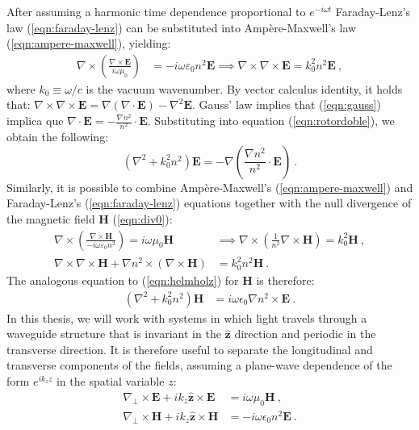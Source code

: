 After assuming a harmonic time dependence proportional to $e^{-i\omega t}$ Faraday-Lenz's law (\ref{eqn:faraday-lenz}) can be substituted into Ampère-Maxwell's law (\ref{eqn:ampere-maxwell}), yielding:
\begin{align}
	\nabla\times\left(\frac{\nabla\times\textbf{E}}{i\omega\mu_0}\right) &= -i\omega \varepsilon_0 n^2 \textbf{E} \implies \nabla\times\nabla\times\textbf{E} = k_0^2n^2\textbf{E} \ , \label{eqn:rotordoble}
\end{align}
where $k_0 \equiv \omega/c$ is the vacuum wavenumber. By vector calculus identity, it holds that: $\nabla\times\nabla\times\textbf{E} = \nabla(\nabla\cdot\textbf{E}) - \nabla^2\textbf{E}$. Gauss' law implies that (\ref{eqn:gauss}) implica que $\nabla\cdot \textbf{E} = -\frac{\nabla n^2}{n^2}\cdot\textbf{E}$. Substituting into equation (\ref{eqn:rotordoble}), we obtain the following:
\begin{equation}
	\left(\nabla^2  + k_0^2n^2\right)\textbf{E} = -\nabla\left( \frac{\nabla n^2}{n^2} \cdot \textbf{E}  \right) \ . \label{eqn:helmholz}
\end{equation}
Similarly, it is possible to combine Ampère-Maxwell's (\ref{eqn:ampere-maxwell}) and Faraday-Lenz's (\ref{eqn:faraday-lenz}) equations together with the null divergence of the magnetic field \textbf{H} (\ref{eqn:div0}):
\begin{align}
	\nabla\times \left(\frac{\nabla\times\textbf{H}}{-i\omega \varepsilon_0 n^2}\right) = i\omega \mu_0 \textbf{H} &\implies \nabla\times \left(\frac{1}{n^2}\nabla\times\textbf{H}\right) = k_0^2 \textbf{H} \ ,
	\nonumber
	\\
	\nabla\times\nabla\times\textbf{H} + \nabla n^2 \times \left( \nabla\times\textbf{H}\right)
	&= 
	  k_0^2 n^2\textbf{H} \ .
	 	\nonumber
\end{align}
The analogous equation to (\ref{eqn:helmholz}) for \textbf{H} is therefore:
\begin{align}
	 \left(\nabla^2  + k_0^2 n^2 \right) \textbf{H} &= i\omega \epsilon_0 \nabla n^2 \times \textbf{E} \ .
	 \label{eqn:helmholzH}
\end{align}
In this thesis, we will work with systems in which light travels through a waveguide structure that is invariant in the $\hat{\mathbf{z}}$ direction and periodic in the transverse direction. It is therefore useful to separate the longitudinal and transverse components of the fields, assuming a plane-wave dependence of the form $e^{i k_z z}$ in the spatial variable $z$:
\begin{align}
	\nabla_\perp \times  \textbf{E} + ik_z \hat{\textbf{z}} \times \textbf{E} &= i\omega\mu_0\textbf{H} \ ,
	\label{eqn:EfieldH}
	\\
	\nabla_\perp \times  \textbf{H} + ik_z \hat{\textbf{z}} \times \textbf{H} &= -i\omega \epsilon_0 n^2 \textbf{E} \ .
	\label{eqn:HfieldE}
\end{align}
